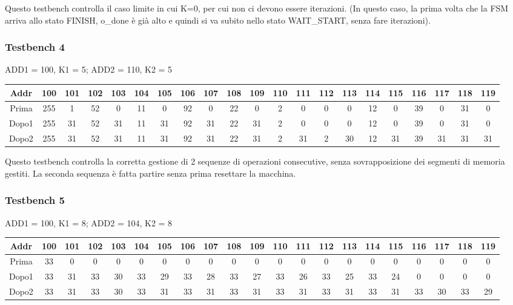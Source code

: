 \documentclass{article}
\begin{document}
Questo testbench controlla il caso limite in cui K=0, per cui non ci devono essere iterazioni. (In questo caso, la prima volta che la FSM arriva allo stato FINISH, o\_done è già alto e quindi si va subito nello stato WAIT\_START, senza fare iterazioni).

\subsubsection{Testbench 4}

ADD1 = 100, K1 = 5; ADD2 = 110, K2 = 5
\begin{table}[H]
    \begin{adjustwidth}{-1.75cm}{}
    \centering
    \begin{tabular}{|c|*{20}{c|}}
        \hline
        Addr & 100 & 101 & 102 & 103 & 104 & 105 & 106 & 107 & 108 & 109 & 110 & 111 & 112 & 113 & 114 & 115 & 116 & 117 & 118 & 119 \\
        \hline
        Prima & 255 & 1 & 52 & 0 & 11 & 0 & 92 & 0 & 22 & 0 & 2 & 0 & 0 & 0 & 12 & 0 & 39 & 0 & 31 & 0 \\
        Dopo1 & 255 & 31 & 52 & 31 & 11 & 31 & 92 & 31 & 22 & 31 & 2 & 0 & 0 & 0 & 12 & 0 & 39 & 0 & 31 & 0 \\
        Dopo2 & 255 & 31 & 52 & 31 & 11 & 31 & 92 & 31 & 22 & 31 & 2 & 31 & 2 & 30 & 12 & 31 & 39 & 31 & 31 & 31 \\
        \hline
    \end{tabular}
    \end{adjustwidth}
\end{table}

Questo testbench controlla la corretta gestione di 2 sequenze di operazioni consecutive, senza sovrapposizione dei segmenti di memoria gestiti. La seconda sequenza è fatta partire senza prima resettare la macchina.

\subsubsection{Testbench 5}

ADD1 = 100, K1 = 8; ADD2 = 104, K2 = 8
\begin{table}[H]
    \begin{adjustwidth}{-1.75cm}{}
    \centering
    \begin{tabular}{|c|*{20}{c|}}
        \hline
        Addr & 100 & 101 & 102 & 103 & 104 & 105 & 106 & 107 & 108 & 109 & 110 & 111 & 112 & 113 & 114 & 115 & 116 & 117 & 118 & 119 \\
        \hline
        Prima & 33 & 0 & 0 & 0 & 0 & 0 & 0 & 0 & 0 & 0 & 0 & 0 & 0 & 0 & 0 & 0 & 0 & 0 & 0 & 0 \\
        Dopo1 & 33 & 31 & 33 & 30 & 33 & 29 & 33 & 28 & 33 & 27 & 33 & 26 & 33 & 25 & 33 & 24 & 0 & 0 & 0 & 0 \\
        Dopo2 & 33 & 31 & 33 & 30 & 33 & 31 & 33 & 31 & 33 & 31 & 33 & 31 & 33 & 31 & 33 & 31 & 33 & 30 & 33 & 29 \\
        \hline
    \end{tabular}
    \end{adjustwidth}
\end{table}
\end{document}
